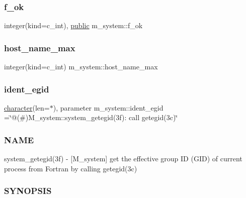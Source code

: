 \subsubsection{\texorpdfstring{f\+\_\+ok}{f\_ok}}
{\footnotesize\ttfamily integer(kind=c\+\_\+int), \hyperlink{M__stopwatch_83_8txt_a2f74811300c361e53b430611a7d1769f}{public} m\+\_\+system\+::f\+\_\+ok}

\mbox{\label{namespacem__system_aa09d58a58be96e7d172c8c2b14744cdb}} 
\subsubsection{\texorpdfstring{host\+\_\+name\+\_\+max}{host\_name\_max}}
{\footnotesize\ttfamily integer(kind=c\+\_\+int) m\+\_\+system\+::host\+\_\+name\+\_\+max\hspace{0.3cm}{\ttfamily [private]}}

\mbox{\label{namespacem__system_ad016bff246da00ba4d615fd68345d120}} 
\subsubsection{\texorpdfstring{ident\+\_\+egid}{ident\_egid}}
{\footnotesize\ttfamily \hyperlink{option__stopwatch_83_8txt_abd4b21fbbd175834027b5224bfe97e66}{character}(len=$\ast$), parameter m\+\_\+system\+::ident\+\_\+egid =\char`\"{}@(\#)M\+\_\+system\+::system\+\_\+getegid(3f)\+: call getegid(3c)\char`\"{}\hspace{0.3cm}{\ttfamily [private]}}



\subsubsection*{N\+A\+ME}

system\+\_\+getegid(3f) -\/ \mbox{[}M\+\_\+system\mbox{]} get the effective group ID (G\+ID) of current process from Fortran by calling getegid(3c) \subsubsection*{S\+Y\+N\+O\+P\+S\+IS}

